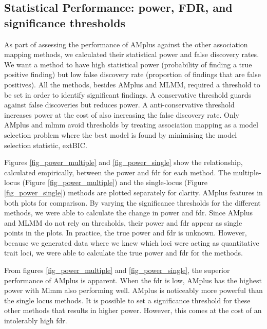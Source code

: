 \documentclass{nature}
\begin{document}
\subsection{Statistical Performance: power, FDR, and significance thresholds}

As part of assessing the performance of AMplus against the other association mapping methods, 
we calculated their statistical power and false discovery rates. 
We want a method to have high statistical power (probability of finding a true positive finding) but 
low false discovery rate (proportion of findings that are false positives). 
All the methods, besides AMplus and MLMM, required a threshold to be set in order to identify significant findings. 
A conservative threshold guards against false discoveries but reduces power. 
A anti-conservative threshold increases power at the cost of also increasing the false discovery rate. Only AMplus and mlmm avoid thresholds by treating association mapping as a model selection problem where the best model is found by minimising the model selection statistic, extBIC.

Figures \ref{fig_power_multiple}  and \ref{fig_power_single} show the relationship, calculated empirically, between the power and fdr for each method. The multiple-locus (Figure \ref{fig_power_multiple})   and the single-locus (Figure \ref{fig_power_single})  methods are plotted separately for clarity. 
AMplus features in both plots for comparison. By varying the significance thresholds for the different methods, we were able to calculate the change in power and fdr. Since AMplus and MLMM do not rely on thresholds, their power and fdr appear as single points in the plots. In practice, the true power and fdr is unknown. However, because we generated data where we knew which loci were acting as quantitative trait loci, we were able to calculate the true power and fdr for the methods.

From figures \ref{fig_power_multiple}  and \ref{fig_power_single}, the superior performance of AMplus is apparent. When the fdr is low, AMplus has the highest power with Mlmm also performing well. AMplus is noticeably more powerful than the single locus methods. 
It is possible to set a significance threshold for these other methods that results in higher power. 
However, this comes at the cost of an intolerably high fdr.
\end{document}
